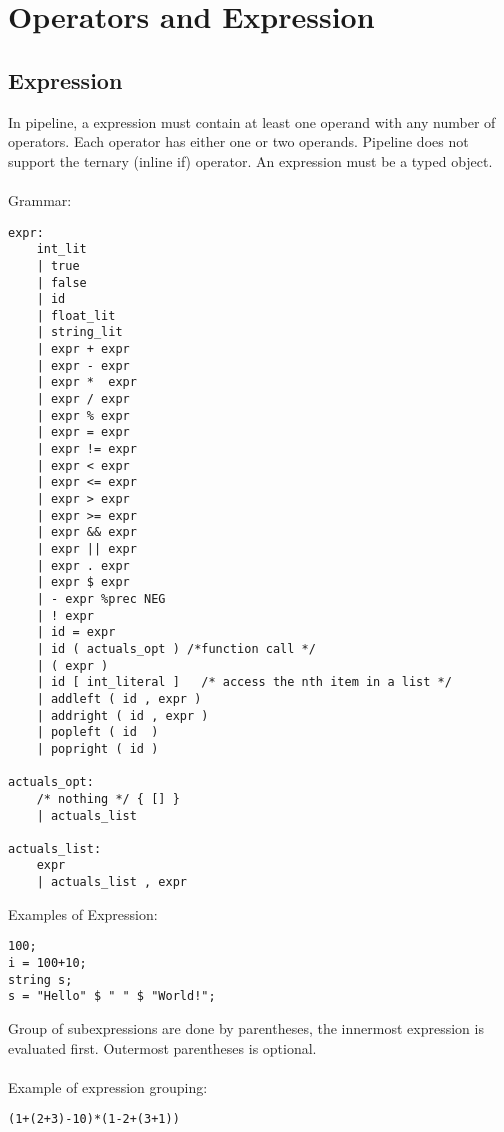 \documentclass[./LRM_main.tex]{subfiles}
\begin{document}
\section{Operators and Expression}
\subsection{Expression}
In pipeline, a expression must contain at least one operand with any number of operators. Each operator has either one or two operands. Pipeline does not support the ternary (inline if) operator. An expression must be a typed object.\\ 
\vspace{1mm}\\
Grammar:
\begin{lstlisting}
expr:
    int_lit
    | true
    | false
    | id
    | float_lit    
    | string_lit
    | expr + expr
    | expr - expr            
    | expr *  expr           
    | expr / expr           
    | expr % expr
    | expr = expr           
    | expr != expr           
    | expr < expr           
    | expr <= expr           
    | expr > expr           
    | expr >= expr           
    | expr && expr           
    | expr || expr           
    | expr . expr           
    | expr $ expr           
    | - expr %prec NEG       
    | ! expr                   
    | id = expr             
    | id ( actuals_opt ) /*function call */
    | ( expr )          
    | id [ int_literal ]   /* access the nth item in a list */ 
    | addleft ( id , expr )  
    | addright ( id , expr ) 
    | popleft ( id  ) 
    | popright ( id ) 
    
actuals_opt:
    /* nothing */ { [] }
    | actuals_list

actuals_list:
    expr
    | actuals_list , expr
\end{lstlisting}
Examples of Expression:
\begin{lstlisting}
100;
i = 100+10;
string s;
s = "Hello" $ " " $ "World!";
\end{lstlisting}
\vspace{1 mm}
Group of subexpressions are done by parentheses, the innermost expression is evaluated first. Outermost parentheses is optional.\\
\vspace{1 mm}\\
Example of expression grouping:
\begin{lstlisting}
(1+(2+3)-10)*(1-2+(3+1))
\end{lstlisting}
\end{document}

